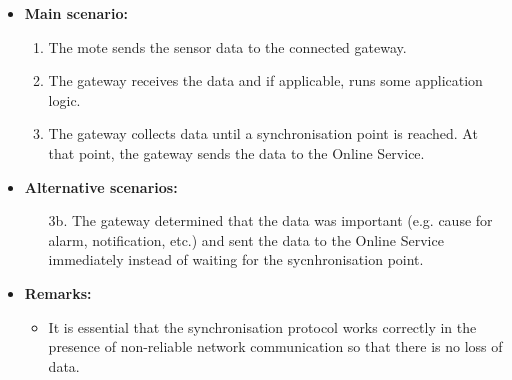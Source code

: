 \begin{itemize}
    \item \textbf{Main scenario:}
        \begin{enumerate}
           \item The mote sends the sensor data to the connected gateway.
           \item The gateway receives the data and if applicable, runs some application logic.
           \item The gateway collects data until a synchronisation point is reached.
                 At that point, the gateway sends the data to the Online Service.
        \end{enumerate}

    \item \textbf{Alternative scenarios:}
        \begin{enumerate}
            \item [3b.] The gateway determined that the data was important
                  (e.g. cause for alarm, notification, etc.) and sent the data
                  to the Online Service immediately instead of waiting for the
                  sycnhronisation point.
        \end{enumerate}

    \item \textbf{Remarks:}
        \begin{itemize}
            \item It is essential that the synchronisation protocol works
                  correctly in the presence of non-reliable network communication
                  so that there is no loss of data.
        \end{itemize}
\end{itemize}

